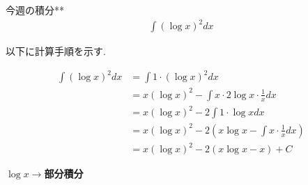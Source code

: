 \documentclass[main]{subfiles}
\begin{document}

\begin{mondai}{9}{今週の積分}{**}
    \begin{align*}
        \int (\log x)^2 dx
    \end{align*}
\end{mondai}


\solutionhead
\hfill
以下に計算手順を示す.
\hfill\

\begin{align*}
\int (\log x)^2 dx &= \int 1 \cdot (\log x)^2 dx \\
&= x(\log x)^2 - \int x \cdot 2 \log x \cdot \frac{1}{x} dx \\
&= x(\log x)^2 - 2 \int 1\cdot \log x dx \\
&= x(\log x)^2 - 2 \left( x \log x - \int x \cdot \frac{1}{x} dx \right) \\
&= x(\log x)^2 - 2(x \log x - x) + C
\end{align*}

\begin{focusbox}
\centering
\textbf{$\log x\rightarrow$部分積分}
\end{focusbox}
\end{document}
